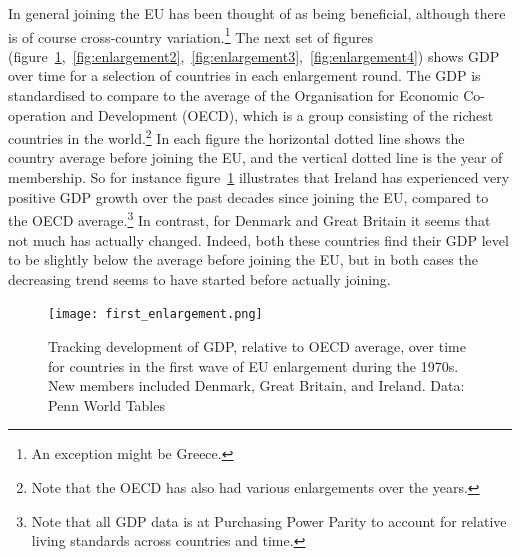\documentclass{tufte-handout}
\begin{document}
In general joining the EU has been thought of as being beneficial, although there is of course cross-country variation.\footnote{An exception might be Greece.} 
The next set of figures (figure~\ref{fig:enlargement1},~\ref{fig:enlargement2},~\ref{fig:enlargement3},~\ref{fig:enlargement4}) shows GDP over time for a selection of countries in each enlargement round. 
The GDP is standardised to compare to the average of the  Organisation for Economic Co-operation and Development (OECD), which is a group consisting of the richest countries in the world.\footnote{Note that the OECD has also had various enlargements over the years.}
In each figure the horizontal dotted line shows the country average before joining the EU, and the vertical dotted line is the year of membership. 
So for instance figure~\ref{fig:enlargement1} illustrates that Ireland has experienced very positive GDP growth over the past decades since joining the EU, compared to the OECD average.\footnote{Note that all GDP data is at Purchasing Power Parity to account for relative living standards across countries and time.} 
In contrast, for Denmark and Great Britain it seems that not much has actually changed. 
Indeed, both these countries find their GDP level to be slightly below the average before joining the EU, but in both cases the decreasing trend seems to have started before actually joining. 
\begin{figure} \centering
    \texttt{[image: first\_enlargement.png]}
    \caption{Tracking development of GDP, relative to OECD average, over time for countries in the first wave of EU enlargement during the 1970s. New members included Denmark, Great Britain, and Ireland. Data: Penn World Tables}
    \label{fig:enlargement1}
  \end{figure}
\end{document}
